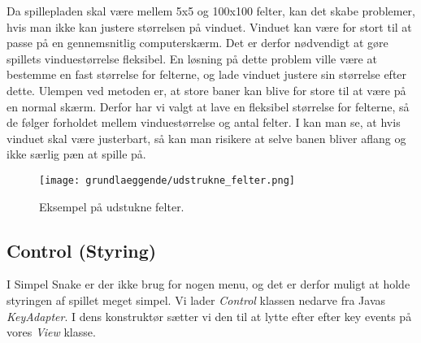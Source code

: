 Da spillepladen skal være mellem 5x5 og 100x100 felter, kan det skabe problemer, hvis man ikke kan justere størrelsen på vinduet. Vinduet kan være for stort til at passe på en gennemsnitlig computerskærm. Det er derfor nødvendigt at gøre spillets vinduestørrelse fleksibel. En løsning på dette problem ville være at bestemme en fast størrelse for felterne, og lade vinduet justere sin størrelse efter dette. Ulempen ved metoden er, at store baner kan blive for store til at være på en normal skærm. Derfor har vi valgt at lave en fleksibel størrelse for felterne, så de følger forholdet mellem vinduestørrelse og antal felter.
I  kan man se, at hvis vinduet skal være justerbart, så kan man risikere at selve banen bliver aflang og ikke særlig pæn at spille på.

\begin{figure}
	\centering
	\texttt{[image: grundlaeggende/udstrukne\_felter.png]}
	\caption{Eksempel på udstukne felter.}
\end{figure}

\subsection{Control (Styring)}
I Simpel Snake er der ikke brug for nogen menu, og det er derfor muligt at holde styringen af spillet meget simpel. Vi lader \textit{Control} klassen nedarve fra Javas \textit{KeyAdapter}. I dens konstruktør sætter vi den til at lytte efter efter key events på vores \textit{View} klasse.
